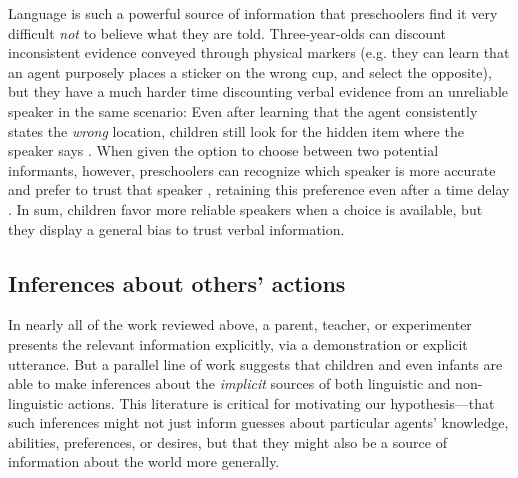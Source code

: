 \documentclass[man]{apa2}
\begin{document}
Language is such a powerful source of information that preschoolers find it very difficult \emph{not} to believe what they are told.  Three-year-olds can discount inconsistent evidence conveyed through physical markers (e.g. they can learn that an agent purposely places a sticker on the wrong cup, and select the opposite), but they have a much harder time discounting verbal evidence from an unreliable speaker in the same scenario: Even after learning that the agent consistently states the \emph{wrong} location, children still look for the hidden item where the speaker says \cite{jaswal2010}.  When given the option to choose between two potential informants, however, preschoolers can recognize which speaker is more accurate and prefer to trust that speaker \cite{pasquini2007}, retaining this preference even after a time delay \cite{corriveau2009}.  In sum, children favor more reliable speakers when a choice is available, but they display a general bias to trust verbal information.







\subsection{Inferences about others' actions}


In nearly all of the work reviewed above, a parent, teacher, or experimenter presents the relevant information explicitly, via a demonstration or explicit utterance. But a parallel line of work suggests that children and even infants are able to make inferences about the \emph{implicit} sources of both linguistic and non-linguistic actions. This literature is critical for motivating our hypothesis---that such inferences might not just inform guesses about particular agents' knowledge, abilities, preferences, or desires, but that they might also be a source of information about the world more generally. 
\end{document}

